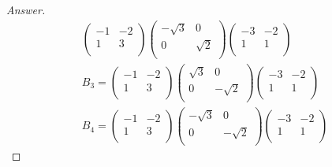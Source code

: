 \documentclass[../psets.tex]{subfiles}
\begin{document}
\begin{enumerate}[label={\textbf{2.\arabic*.}}]
\begin{proof}[Answer]
\begin{gather*}
            \begin{pmatrix}
                -1 & -2\\
                1 & 3\\
            \end{pmatrix}
            \begin{pmatrix}
                -\sqrt{3} & 0\\
                0 & \sqrt{2}\\
            \end{pmatrix}
            \begin{pmatrix}
                -3 & -2\\
                1 & 1\\
            \end{pmatrix}\\
            B_3 =
            \begin{pmatrix}
                -1 & -2\\
                1 & 3\\
            \end{pmatrix}
            \begin{pmatrix}
                \sqrt{3} & 0\\
                0 & -\sqrt{2}\\
            \end{pmatrix}
            \begin{pmatrix}
                -3 & -2\\
                1 & 1\\
            \end{pmatrix}\\
            B_4 =
            \begin{pmatrix}
                -1 & -2\\
                1 & 3\\
            \end{pmatrix}
            \begin{pmatrix}
                -\sqrt{3} & 0\\
                0 & -\sqrt{2}\\
            \end{pmatrix}
            \begin{pmatrix}
                -3 & -2\\
                1 & 1\\
            \end{pmatrix}
        \end{gather*}
    \end{proof}

\end{enumerate}
\end{document}
